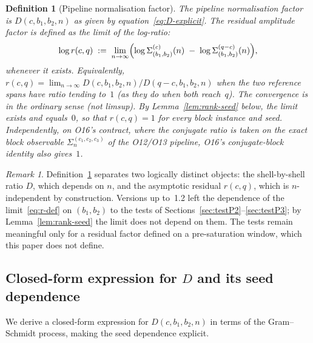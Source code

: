 \documentclass[11pt,a4paper]{article}
\newtheorem{definition}[theorem]{Definition}
\theoremstyle{remark}
\newtheorem{remark}[theorem]{Remark}
\newcommand{\rcq}{r(c,q)}
\begin{document}
    \begin{definition}[Pipeline normalisation factor]
      \label{def:D}
      The \emph{pipeline normalisation factor} is $D(c, b_{1}, b_{2}, n)$ as given
      by equation~\eqref{eq:D-explicit}.
      The \emph{residual amplitude factor} is defined as the limit of the log-ratio:
      \begin{equation}
        \label{eq:r-def}
        \log \rcq
        \;:=\;
        \lim_{n\to\infty}
        \Bigl(
        \log \Sigma^{(c)}_{(b_{1},b_{2})}(n)
        \;-\;
        \log \Sigma^{(q-c)}_{(b_{1},b_{2})}(n)
        \Bigr),
      \end{equation}
      whenever it exists.
      Equivalently, $\rcq = \lim_{n\to\infty} D(c,b_{1},b_{2},n) / D(q-c,b_{1},b_{2},n)$ when the two
      reference spans have ratio tending to~$1$ (as they do when both reach~$q$).
      The convergence is in the ordinary sense (not limsup).
      By Lemma~\ref{lem:rank-seed} below, the limit exists and equals~$0$, so that $\rcq = 1$ for
      every block instance and seed.
      Independently, on O16's contract, where the conjugate ratio is taken on the exact block
      observable $\Sigma_n^{(c_1,c_2,c_3)}$ of the O12/O13 pipeline, O16's conjugate-block identity
      also gives~$1$.
    \end{definition}

    \begin{remark}
      \label{rem:D-layers-sep}
      Definition~\ref{def:D} separates two logically distinct objects: the shell-by-shell ratio $D$,
      which depends on $n$, and the asymptotic residual $\rcq$, which is $n$-independent by
      construction.
      Versions up to~1.2 left the dependence of the limit~\eqref{eq:r-def} on $(b_{1}, b_{2})$ to
      the tests of Sections~\ref{sec:testP2}--\ref{sec:testP3}; by Lemma~\ref{lem:rank-seed} the
      limit does not depend on them.
      The tests remain meaningful only for a residual factor defined on a pre-saturation window,
      which this paper does not define.
    \end{remark}

  \subsection{Closed-form expression for $D$ and its seed dependence}
    \label{subsec:D-closed}

    We derive a closed-form expression for $D(c, b_{1}, b_{2}, n)$ in terms of the
    Gram--Schmidt process, making the seed dependence explicit.
\end{document}
